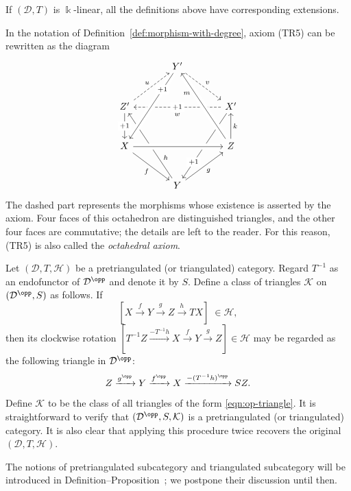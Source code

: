 If $(\mathcal{D},T)$ is $\Bbbk$-linear, all the definitions above have
corresponding extensions.

\begin{remark}
	In the notation of Definition~\ref{def:morphism-with-degree}, axiom (TR5)
	can be rewritten as the diagram
	\[\begin{tikzcd}[column sep=large,row sep=large]
		& Y' \arrow[dashed,rd,"v"] \\
		Z' \arrow[dashed,ru,"u"] \arrow[d,"+1" description] &&
		X' \arrow[dashed,ll,"+1" description,"w" inner sep=0.6em]
		\arrow[ldd,"+1" description,near end] \\
		X \arrow[rd,"f"'] && Z \arrow[u,"k"'] \\
		& Y \arrow[ru,"g"'] \arrow[luu,"h"',near start] &
		\arrow[from=1-2,to=3-1,crossing over,"+1" description,near start]
		\arrow[from=3-1,to=3-3,crossing over]
		\arrow[from=3-3,to=1-2,crossing over,"m",near end]
	\end{tikzcd}\]
	The dashed part represents the morphisms whose existence is asserted by
	the axiom. Four faces of this octahedron are distinguished triangles, and
	the other four faces are commutative; the details are left to the reader.
	For this reason, (TR5) is also called the \emph{octahedral axiom}.
\end{remark}

\begin{remark}[Duality]\label{rem:triangulated-op}
	Let $(\mathcal{D},T,\mathcal{H})$ be a pretriangulated (or triangulated)
	category. Regard $T^{-1}$ as an endofunctor of
	$\mathcal{D}^{\opp}$ and denote it by $S$. Define a class of triangles
	$\mathcal{K}$ on $(\mathcal{D}^{\opp},S)$ as follows. If
	\[ [X\xrightarrow{f}Y\xrightarrow{g}Z\xrightarrow{h}TX]
		\;\in\mathcal{H}, \]
	then its clockwise rotation
	$[T^{-1}Z\xrightarrow{-T^{-1}h}X\xrightarrow{f}Y\xrightarrow{g}Z]
	\in\mathcal{H}$ may be regarded as the following triangle in
	$\mathcal{D}^{\opp}$:
	\begin{equation}\label{eqn:op-triangle}
		Z\xrightarrow{g^{\opp}}Y\xrightarrow{f^{\opp}}X
		\xrightarrow{-(T^{-1}h)^{\opp}}SZ.
	\end{equation}
	Define $\mathcal{K}$ to be the class of all triangles of the form
	\eqref{eqn:op-triangle}. It is straightforward to verify that
	$(\mathcal{D}^{\opp},S,\mathcal{K})$ is a pretriangulated (or
	triangulated) category. It is also clear that applying this procedure
	twice recovers the original $(\mathcal{D},T,\mathcal{H})$.
\end{remark}

The notions of pretriangulated subcategory and triangulated subcategory will
be introduced in
Definition--Proposition~;
we postpone their discussion until then.
